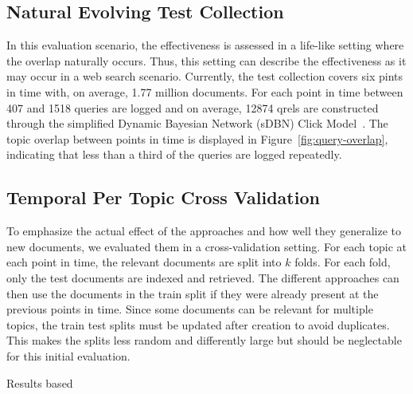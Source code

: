 \subsection{Natural Evolving Test Collection}
In this evaluation scenario, the effectiveness is assessed in a life-like setting where the overlap naturally occurs. Thus, this setting can describe the effectiveness as it may occur in a web search scenario. Currently, the test collection covers six pints in time with, on average, 1.77 million documents. For each point in time between 407 and 1518 queries are logged and on average, 12874 qrels are constructed through the simplified Dynamic Bayesian Network (sDBN) Click Model~\cite{chapelle:2009}. The topic overlap between points in time is displayed in Figure~\ref{fig:query-overlap}, indicating that less than a third of the queries are logged repeatedly.



\subsection{Temporal Per Topic Cross Validation}
To emphasize the actual effect of the approaches and how well they generalize to new documents, we evaluated them in a cross-validation setting. For each topic at each point in time, the relevant documents are split into $k$ folds. For each fold, only the test documents are indexed and retrieved. The different approaches can then use the documents in the train split if they were already present at the previous points in time. Since some documents can be relevant for multiple topics, the train test splits must be updated after creation to avoid duplicates. This makes the splits less random and differently large but should be neglectable for this initial evaluation.

\begin{table}[t]%
    \small%
    \centering%
    \renewcommand{\tabcolsep}{4pt}%
    \caption{ Results based}%
    \label{tab:table-results-fold}%
    
\end{table}  
